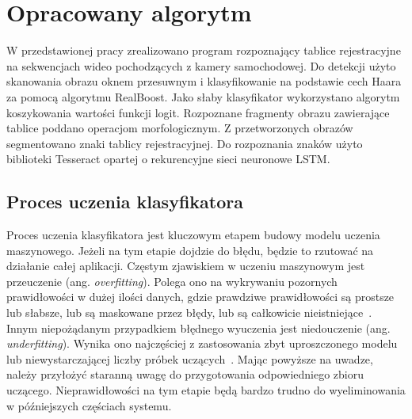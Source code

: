 
\chapter{Opracowany algorytm}
\label{ch:opracowany-algorytm}
W przedstawionej pracy zrealizowano program rozpoznający tablice rejestracyjne na sekwencjach wideo pochodzących z kamery samochodowej.
Do detekcji użyto skanowania obrazu oknem przesuwnym i klasyfikowanie na podstawie cech Haara za pomocą algorytmu RealBoost.
Jako słaby klasyfikator wykorzystano algorytm koszykowania wartości funkcji logit.
Rozpoznane fragmenty obrazu zawierające tablice poddano operacjom morfologicznym.
Z przetworzonych obrazów segmentowano znaki tablicy rejestracyjnej.
Do rozpoznania znaków użyto biblioteki Tesseract opartej o rekurencyjne sieci neuronowe LSTM\@.


\section{Proces uczenia klasyfikatora}
\label{sec:proces-uczenia-klasyfikatora}
Proces uczenia klasyfikatora jest kluczowym etapem budowy modelu uczenia maszynowego.
Jeżeli na tym etapie dojdzie do błędu, będzie to rzutować na działanie całej aplikacji.
Częstym zjawiskiem w uczeniu maszynowym jest przeuczenie (ang. \textit{overfitting}).
Polega ono na wykrywaniu pozornych prawidłowości w dużej ilości danych, gdzie prawdziwe prawidłowości są prostsze lub słabsze, lub są maskowane przez błędy, lub są całkowicie nieistniejące~\cite{overfitting}.
Innym niepożądanym przypadkiem błędnego wyuczenia jest niedouczenie (ang. \textit{underfitting}).
Wynika ono najczęściej z zastosowania zbyt uproszczonego modelu lub niewystarczającej liczby próbek uczących~\cite{overfitting}.
Mając powyższe na uwadze, należy przyłożyć staranną uwagę do przygotowania odpowiedniego zbioru uczącego.
Nieprawidłowości na tym etapie będą bardzo trudno do wyeliminowania w późniejszych częściach systemu.

